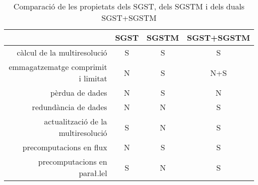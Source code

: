 \begin{table}[tp]
  \centering
  \begin{tabular}[c]{r|ccc}
  & \gls{SGST} & \gls{SGSTM} & \gls{SGST}+\gls{SGSTM}\\\hline
  càlcul de la multiresolució & S & S & S \\
  emmagatzematge comprimit i limitat & N & S & N+S\\
  pèrdua de dades & N & S & N\\
  redundància de dades & N & N & S\\ 
  actualització de la multiresolució & S & N & S\\
  precomputacions en flux & N & S & S\\
  precomputacions en para\l.lel & S & N & S\\
\end{tabular}
  \caption{Comparació de les propietats dels \gls{SGST}, dels \gls{SGSTM} i dels duals \gls{SGST}+\gls{SGSTM}}
  \label{fig:multiresolucio:comparacio-propietats}
\end{table}













